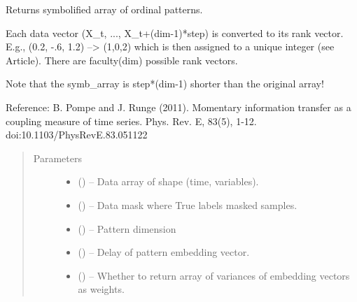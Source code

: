 \documentclass[letterpaper,10pt,english]{sphinxmanual}
\begin{document}
\begin{fulllineitems}
\label{\detokenize{index:tigramite.data_processing.ordinal_patt_array}}
Returns symbolified array of ordinal patterns.

Each data vector (X\_t, ..., X\_t+(dim-1)*step) is converted to its rank
vector. E.g., (0.2, -.6, 1.2) --\textgreater{} (1,0,2) which is then assigned to a
unique integer (see Article). There are faculty(dim) possible rank vectors.

Note that the symb\_array is step*(dim-1) shorter than the original array!

Reference: B. Pompe and J. Runge (2011). Momentary information transfer as
a coupling measure of time series. Phys. Rev. E, 83(5), 1-12.
doi:10.1103/PhysRevE.83.051122
\begin{quote}\begin{description}
\item[{Parameters}] \leavevmode\begin{itemize}
\item {} 
 () -- Data array of shape (time, variables).

\item {} 
 () -- Data mask where True labels masked samples.

\item {} 
 (\sphinxstyleliteralemphasis{, }\sphinxstyleliteralemphasis{ (}\sphinxstyleliteralemphasis{)}\sphinxstyleliteralemphasis{}) -- Pattern dimension

\item {} 
 (\sphinxstyleliteralemphasis{, }\sphinxstyleliteralemphasis{ (}\sphinxstyleliteralemphasis{)}\sphinxstyleliteralemphasis{}) -- Delay of pattern embedding vector.

\item {} 
 (\sphinxstyleliteralemphasis{, }\sphinxstyleliteralemphasis{ (}\sphinxstyleliteralemphasis{)}\sphinxstyleliteralemphasis{}) -- Whether to return array of variances of embedding vectors as weights.


\end{itemize}
\end{description}
\end{quote}
\end{fulllineitems}
\end{document}
